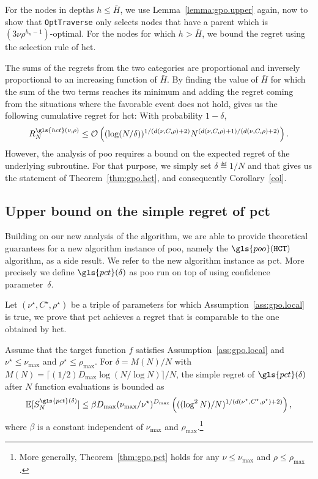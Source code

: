 For the nodes in depths $h \leq \bar H$, we  use
Lemma~\ref{lemma:gpo.upper} again, now to show that \texttt{OptTraverse} only selects nodes
that have a parent which is $(3\nu\rho^{h_n-1})$-optimal.
For the nodes for which  $h > \bar H$, we bound the regret using the
selection rule of \gls{hct}.

The sums of the regrets from the two categories are proportional
and inversely proportional to an increasing function of $\bar H$.
By finding the value of $\bar H$ for which the sum of the two
terms reaches its minimum and adding the regret coming
from the situations where the favorable event does not hold,
gives us the following cumulative regret for \gls{hct}: With probability $1-\delta$,
\[
	R_N^{\gls{hct}(\nu,\rho)} \leq \cO\left( (\log(N/\delta))^{1/(d(\nu,C,\rho)+2)}N^{(d(\nu,C,\rho)+1)/(d(\nu,C,\rho)+2)} \right).
\]
However, the analysis of \gls{poo} requires a bound on the expected regret of the underlying subroutine. For that purpose, we simply set $\delta \eqdef 1/N$ and that gives us the statement of Theorem~\ref{thm:gpo.hct}, and consequently Corollary~\ref{col}.

\subsection{Upper bound on the simple regret of \gls{pct}{}}

Building on our new analysis of the \HCT{} algorithm, we are able to provide theoretical guarantees for a new algorithm instance of \gls{poo}, namely the $\gls{poo}(\HCT)$ algorithm, as a side result. We refer to the new algorithm instance as \gls{pct}. More precisely we define $\gls{pct}(\delta)$ as \gls{poo} run on top of \HCT using confidence parameter~$\delta$.

Let $(\nu^\star,C^\star,\rho^\star)$ be a triple of parameters for which Assumption~\ref{ass:gpo.local} is true, we prove that \gls{pct} achieves a regret that is comparable to the one obtained by \gls{hct}.


\begin{theorem}\label{thm:gpo.pct}
\begin{leftbar}[theorembar]
Assume that the target function $f$ satisfies Assumption~\ref{ass:gpo.local} and $\nu^\star \leq \nu_{\max}$ and $\rho^\star \leq \rho_{\max}$. For $\delta = M(N)/N$ with $M(N) = \lceil (1/2)D_{\max}\log(N/\log N)\rceil/N$, the simple regret of $\gls{pct}(\delta)$ after $N$ function evaluations is bounded as
\[
	\mathbb{E}[S_N^{\gls{pct}(\delta)}]  \leq \beta D_{\max}(\nu_{\max}/\nu^\star)^{D_{\max}} \left( ((\log^2 N)/N)^{1/(d(\nu^{\star},C^\star,\rho^{\star})+2)} \right),
\]
where $\beta$ is a constant independent of $\nu_{\max}$ and $\rho_{\max}$.\footnote{More generally, Theorem~\ref{thm:gpo.pct} holds for any $\nu \leq \nu_{\max}$ and $\rho \leq \rho_{\max}$.}
\end{leftbar}
\end{theorem}


